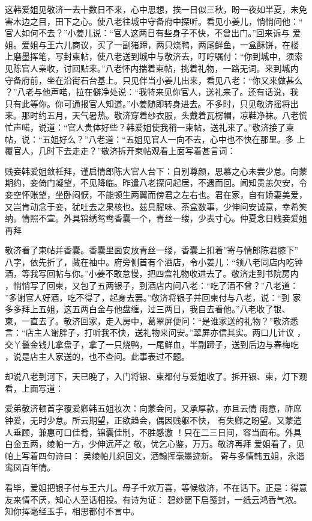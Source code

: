 这韩爱姐见敬济一去十数日不来，心中思想，挨一日似三秋，盼一夜如半夏，未免
害木边之目，田下之心。使八老往城中守备府中探听。看见小姜儿，悄悄问他：“
官人如何不去？”小姜儿说：“官人这两日有些身子不快，不曾出门。”回来诉与
爱姐。爱姐与王六儿商议，买了一副猪蹄，两只烧鸭，两尾鲜鱼，一盒酥饼，在楼
上磨墨挥笔，写封柬帖，使八老送到城中与敬济去，叮咛嘱付：“你到城中，须索
见陈官人亲收，讨回贴来。”八老怀内揣着柬帖，挑着礼物，一路无词。来到城内
守备府前，坐在沿街石台基上。只见伴当小姜儿出来，看见八老：“你又来做甚么
？”八老与他声喏，拉在僻净处说：“我特来见你官人，送礼来了。还有话说，我
只有此等你。你可通报官人知道。”小姜随即转身进去。不多时，只见敬济摇将出
来。那时约五月，天气暑热。敬济穿着纱衣服，头戴着瓦楞帽，凉鞋净袜。八老慌
忙声喏，说道：“官人贵体好些？韩爱姐使我稍一柬帖，送礼来了。”敬济接了柬
帖，说：“五姐好么？”八老道：“五姐见官人一向不去，心中也不快在那里。多
上覆官人，几时下去走走？”敬济拆开柬帖观看上面写着甚言词：

贱妾韩爱姐敛衽拜，谨启情郎陈大官人台下：自别尊颜，思慕之心未尝少怠。向蒙
期约，妾倚门凝望，不见降临。昨遣八老探问起居，不遇而回。闻知贵恙欠安，令
妾空怀账望，坐卧闷恹，不能顿生两翼而傍君之左右也。君在家，自有娇妻美爱，
又岂肯动念于妾，犹吐去之果核也。兹具腥味、茶盒数事，少伸问安诚意，幸希笑
纳。情照不宣。外具锦绣鸳鸯香囊一个，青丝一缕，少表寸心。仲夏念日贱妾爱姐
再拜

敬济看了柬帖并香囊。香囊里面安放青丝一缕，香囊上扣着”寄与情郎陈君膝下”
八字，依先折了，藏在袖中。府旁侧首有个酒店，令小姜儿：“领八老同店内吃钟
酒，等我写回帖与你。”小姜不敢怠慢，把四盒礼物收进去了。敬济走到书院房内
，悄悄写了回柬，又包了五两银子，到酒店内问八老：“吃了酒不曾？”八老道：
”多谢官人好酒，吃不得了，起身去罢。”敬济将银子并回柬付与八老，说：“到
家多多拜上五姐，这五两白金与他盘缠，过三两日，我自去看他。”八老收了银、
柬，一直去了。敬济回家，走入房中，葛翠屏便问：“是谁家送的礼物？”敬济悉
言：“店主人谢胖子，打听我不快，送礼物来问安。”翠屏亦信其实。两口儿计议
，交丫鬟金钱儿拿盘子，拿了一只烧鸭，一尾鲜血，半副蹄子，送到后边与春梅吃
，说是店主人家送的，也不查问。此事表过不题。

却说八老到河下，天已晚了，入门将银、柬都付与爱姐收了。拆开银、柬，灯下观
看，上面写道：

爱弟敬济顿首字覆爱卿韩五姐妆次：向蒙会问，又承厚款，亦且云情
雨意，祚席钟爱，无时少怠。所云期望，正欲趋会，偶因贱躯不快，
有失卿之盼望。又蒙遣人垂顾，兼惠可口佳肴，锦囊佳制，不胜感激
！只在二三日间，容当面布。外具白金五两，绫帕一方，少伸远芹之
敬，优乞心鉴，万万。敬济再拜
爱姐看了，见帕上写着四句诗曰：
吴绫帕儿织回文，洒翰挥毫墨迹新。
寄与多情韩五姐，永谐鸾凤百年情。

看毕，爱姐把银子付与王六儿。母子千欢万喜，等候敬济，不在话下。正是：得意
友来情不厌，知心人至话相投。有诗为证：
碧纱窗下启笺封，一纸云鸿香气浓。
知你挥毫经玉手，相思都付不言中。
